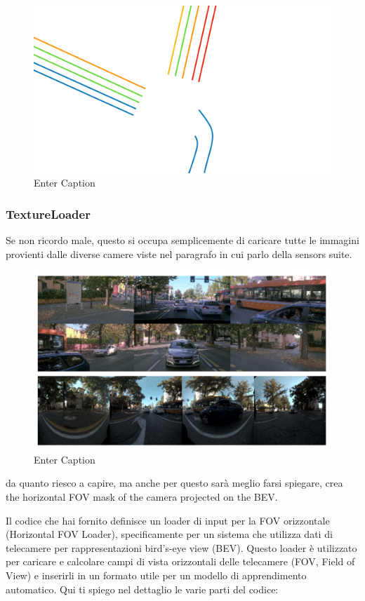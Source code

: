 \begin{figure}
    \centering
    \includegraphics[width=0.75\linewidth]{LateX//figs/mappaHD.pdf}
    \caption{Enter Caption}
    \label{fig:enter-label}
\end{figure}

\subsubsection{TextureLoader}
Se non ricordo male, questo si occupa semplicemente di caricare tutte le immagini provienti dalle diverse camere viste nel paragrafo in cui parlo della sensors suite. 

\begin{figure}
    \centering
    \includegraphics[width=1\linewidth]{LateX//figs/Screenshot 2024-09-27 at 12.00.55.png}
    \caption{Enter Caption}
    \label{fig:enter-label}
\end{figure}

da quanto riesco a capire, ma anche per questo sarà meglio farsi spiegare, crea the horizontal FOV mask of the camera projected on the BEV.

Il codice che hai fornito definisce un loader di input per la FOV orizzontale (Horizontal FOV Loader), specificamente per un sistema che utilizza dati di telecamere per rappresentazioni bird's-eye view (BEV). Questo loader è utilizzato per caricare e calcolare campi di vista orizzontali delle telecamere (FOV, Field of View) e inserirli in un formato utile per un modello di apprendimento automatico. Qui ti spiego nel dettaglio le varie parti del codice:

